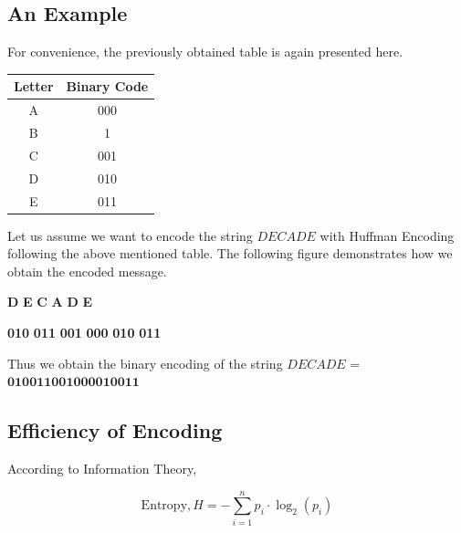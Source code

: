 \documentclass[18pt]{article}
\begin{document}
	\subsection{An Example}
	
	For convenience, the previously obtained table is again presented here.
	
	\begin{table}[h]
		\centering
		\begin{tabular}{|c|c|}
			\hline
			\textbf{Letter} & \textbf{Binary Code} \\
			\hline
			A & 000  \\
			B & 1  \\
			C & 001 \\
			D & 010 \\
			E & 011 \\
			\hline
		\end{tabular}
	\end{table}
	
	Let us assume we want to encode the string $DECADE$ with Huffman Encoding following the above mentioned table. The following figure demonstrates how we obtain the encoded message.
	
	\begin{center}
		\Large
		\textcolor{codecolorone}{\textbf{D}}
		\textcolor{codecolortwo}{\textbf{E}}
		\textcolor{codecolorone}{\textbf{C}}
		\textcolor{codecolortwo}{\textbf{A}}
		\textcolor{codecolorone}{\textbf{D}}
		\textcolor{codecolortwo}{\textbf{E}}
	\end{center}
	
	\begin{center}
		\huge
		\textcolor{codecolorone}{\textbf{010}}
		\textcolor{codecolortwo}{\textbf{011}}
		\textcolor{codecolorone}{\textbf{001}}
		\textcolor{codecolortwo}{\textbf{000}}
		\textcolor{codecolorone}{\textbf{010}}
		\textcolor{codecolortwo}{\textbf{011}}
	\end{center}
	
	Thus we obtain the binary encoding of the string $DECADE$ = $\textbf{010011001000010011}$
	
	\subsection{Efficiency of Encoding}
	
	According to Information Theory,
	
	\[
	\text{Entropy}, H = - \sum_{i=1}^{n} p_i \cdot \log_2(p_i)
	\]
	
\end{document}
